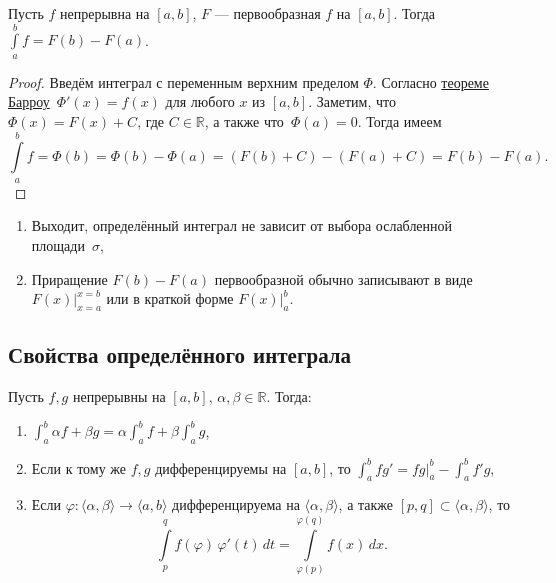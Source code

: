 \hypertarget{t9}{}
\begin{theorem}
	Пусть $f$ непрерывна на $[a, b]$, $F$ --- первообразная $f$ на $[a, b]$. Тогда \(\int\limits_a^b f = F(b) - F(a)\).
\end{theorem}
\begin{proof}
	Введём интеграл с переменным верхним пределом \(\Phi\). Согласно \hyperlink{t8}{теореме Барроу}~$\Phi'(x) = f(x)$ для любого $x$ из $[a, b]$. Заметим, что $\Phi(x) = F(x) + C$, где $C \in \mathbb{R}$, а также что~$\Phi(a) = 0$. Тогда имеем \[
	\int\limits_a^b f = \Phi(b) = \Phi(b) - \Phi(a) = (F(b) + C) - (F(a) + C) = F(b) - F(a). 
	\]
\end{proof}

\begin{remarks}
	\begin{enumerate}
		\item Выходит, определённый интеграл не зависит от выбора ослабленной площади~$\sigma$,
		\item Приращение $F(b) - F(a)$ первообразной обычно записывают в виде $F(x) |_{x = a}^{x = b}$ или в краткой форме $F(x) |_a^b$.
	\end{enumerate}
\end{remarks}

\subsection{Свойства определённого интеграла}

\begin{theorem}
	Пусть $f, g$ непрерывны на $[a, b]$, $\alpha, \beta \in \mathbb{R}$. Тогда:
	\begin{enumerate}
		\item \(\int_a^b \alpha f + \beta g = \alpha \int_a^b f + \beta \int_a^b g\),
		\item Если к тому же $f, g$ дифференцируемы на $[a, b]$, то \(\int_a^b fg' = fg|_a^b - \int_a^b f'g\),
		\item Если $\varphi: \langle \alpha, \beta \rangle \to \langle a, b \rangle$ дифференцируема на $\langle \alpha, \beta \rangle$,
		а также $[p, q] \subset \langle \alpha, \beta \rangle$, то \[
		\int\limits_p^q f(\varphi) \, \varphi'(t) \, dt = \int\limits_{\varphi(p)}^{\varphi(q)} f(x) \, dx.
		\]
	\end{enumerate}
\end{theorem}

